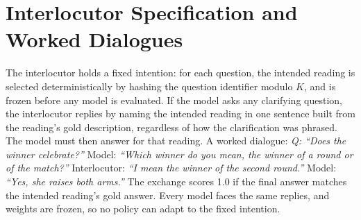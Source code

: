 \section{Interlocutor Specification and Worked Dialogues}
\label{app:interlocutor}

The interlocutor holds a fixed intention: for each question, the intended reading is selected deterministically by hashing the question identifier modulo $K$, and is frozen before any model is evaluated. If the model asks any clarifying question, the interlocutor replies by naming the intended reading in one sentence built from the reading's gold description, regardless of how the clarification was phrased. The model must then answer for that reading. A worked dialogue: \textit{Q: ``Does the winner celebrate?''} Model: \textit{``Which winner do you mean, the winner of a round or of the match?''} Interlocutor: \textit{``I mean the winner of the second round.''} Model: \textit{``Yes, she raises both arms.''} The exchange scores 1.0 if the final answer matches the intended reading's gold answer. Every model faces the same replies, and weights are frozen, so no policy can adapt to the fixed intention.
